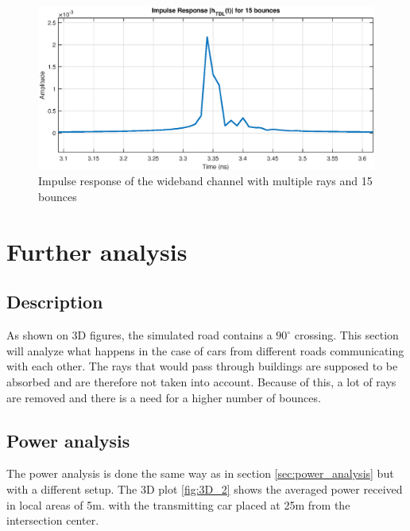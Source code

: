 \documentclass[10pt,a4paper]{ULBreport}
\begin{document}
\begin{figure}[H]
    \centering
    \includegraphics[width=1\textwidth]{5_3_15_bounces.eps}
    \caption{Impulse response of the wideband channel with multiple rays and 15 bounces}
    \label{fig:impulse_response_TDL_15_bounces}
\end{figure}



\chapter{Further analysis}
\section{Description}
As shown on 3D figures, the simulated road contains a $90^\circ$ crossing. This section will analyze what happens in the case of cars from different roads communicating with each other. The rays that would pass through buildings are supposed to be absorbed and are therefore not taken into account. Because of this, a lot of rays are removed and there is a need for a higher number of bounces. \\
\section{Power analysis}
The power analysis is done the same way as in section \ref{sec:power_analysis} but with a different setup. The 3D plot \ref{fig:3D_2} shows the averaged power received in local areas of 5m. with the transmitting car placed at 25m from the intersection center.
\end{document}
